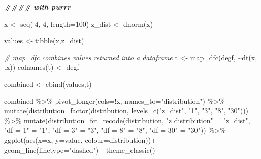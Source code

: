 \documentclass[
]{book}
\newenvironment{Shaded}{\begin{snugshade}}{\end{snugshade}}
\newcommand{\AttributeTok}[1]{\textcolor[rgb]{0.77,0.63,0.00}{#1}}
\newcommand{\CommentTok}[1]{\textcolor[rgb]{0.56,0.35,0.01}{\textit{#1}}}
\newcommand{\DecValTok}[1]{\textcolor[rgb]{0.00,0.00,0.81}{#1}}
\newcommand{\DocumentationTok}[1]{\textcolor[rgb]{0.56,0.35,0.01}{\textbf{\textit{#1}}}}
\newcommand{\FunctionTok}[1]{\textcolor[rgb]{0.00,0.00,0.00}{#1}}
\newcommand{\NormalTok}[1]{#1}
\newcommand{\OtherTok}[1]{\textcolor[rgb]{0.56,0.35,0.01}{#1}}
\newcommand{\SpecialCharTok}[1]{\textcolor[rgb]{0.00,0.00,0.00}{#1}}
\newcommand{\StringTok}[1]{\textcolor[rgb]{0.31,0.60,0.02}{#1}}
\begin{document}
\begin{Shaded}
\begin{Highlighting}[]
\DocumentationTok{\#\#\#\# with purrr}

\NormalTok{x }\OtherTok{\textless{}{-}} \FunctionTok{seq}\NormalTok{(}\SpecialCharTok{{-}}\DecValTok{4}\NormalTok{, }\DecValTok{4}\NormalTok{, }\AttributeTok{length=}\DecValTok{100}\NormalTok{)}
\NormalTok{z\_dist }\OtherTok{\textless{}{-}} \FunctionTok{dnorm}\NormalTok{(x)}

\NormalTok{values }\OtherTok{\textless{}{-}} \FunctionTok{tibble}\NormalTok{(x,z\_dist)}

\CommentTok{\# map\_dfc combines values returned into a dataframe}
\NormalTok{t }\OtherTok{\textless{}{-}} \FunctionTok{map\_dfc}\NormalTok{(degf, }\SpecialCharTok{\textasciitilde{}}\FunctionTok{dt}\NormalTok{(x, .x))}
\FunctionTok{colnames}\NormalTok{(t) }\OtherTok{\textless{}{-}}\NormalTok{ degf}

\NormalTok{combined }\OtherTok{\textless{}{-}} \FunctionTok{cbind}\NormalTok{(values,t)}

\NormalTok{combined }\SpecialCharTok{\%\textgreater{}\%} 
    \FunctionTok{pivot\_longer}\NormalTok{(}\AttributeTok{cols=}\SpecialCharTok{!}\NormalTok{x, }\AttributeTok{names\_to=}\StringTok{"distribution"}\NormalTok{) }\SpecialCharTok{\%\textgreater{}\%} 
    \FunctionTok{mutate}\NormalTok{(}\AttributeTok{distribution=}\FunctionTok{factor}\NormalTok{(distribution, }\AttributeTok{levels=}\FunctionTok{c}\NormalTok{(}\StringTok{"z\_dist"}\NormalTok{, }\StringTok{"1"}\NormalTok{, }\StringTok{"3"}\NormalTok{, }\StringTok{"8"}\NormalTok{, }\StringTok{"30"}\NormalTok{))) }\SpecialCharTok{\%\textgreater{}\%}  
  \FunctionTok{mutate}\NormalTok{(}\AttributeTok{distribution=}\FunctionTok{fct\_recode}\NormalTok{(distribution, }\StringTok{"z distribution"} \OtherTok{=} \StringTok{"z\_dist"}\NormalTok{, }\StringTok{"df = 1"} \OtherTok{=} \StringTok{"1"}\NormalTok{, }\StringTok{"df = 3"} \OtherTok{=} \StringTok{"3"}\NormalTok{, }\StringTok{"df = 8"} \OtherTok{=} \StringTok{"8"}\NormalTok{, }\StringTok{"df = 30"} \OtherTok{=} \StringTok{"30"}\NormalTok{)) }\SpecialCharTok{\%\textgreater{}\%} 
  \FunctionTok{ggplot}\NormalTok{(}\FunctionTok{aes}\NormalTok{(}\AttributeTok{x=}\NormalTok{x, }\AttributeTok{y=}\NormalTok{value, }\AttributeTok{colour=}\NormalTok{distribution))}\SpecialCharTok{+}
  \FunctionTok{geom\_line}\NormalTok{(}\AttributeTok{linetype=}\StringTok{"dashed"}\NormalTok{)}\SpecialCharTok{+}
  \FunctionTok{theme\_classic}\NormalTok{()}
\end{Highlighting}
\end{Shaded}
\end{document}
